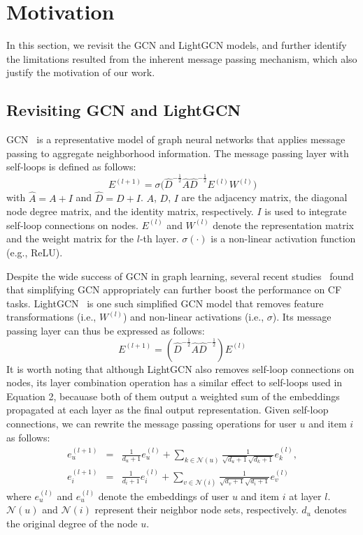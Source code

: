 \documentclass[sigconf,authorversion]{acmart}
\begin{document}
 \section{Motivation} \label{motivation}
In this section, we revisit the GCN and LightGCN models, and further identify the limitations resulted from the inherent message passing mechanism, which also justify the motivation of our work.

 


\subsection{Revisiting GCN and LightGCN}
GCN~\cite{GCN} is a representative model of graph neural networks that applies message passing to aggregate neighborhood information. The message passing layer with self-loops is defined as follows:
\begin{equation}
E^{(l+1)} = \sigma \Big(\hat{D}^{-\frac{1}{2}}\hat{A}\hat{D}^{-\frac{1}{2}}E^{(l)}W^{(l)} \Big)
\end{equation}
with $\hat{A} = A + I$ and $\hat{D} = D + I$. $A$, $D$, $I$ are the adjacency matrix, the diagonal node degree matrix, and the identity matrix, respectively. $I$ is used to integrate self-loop connections on nodes. $E^{(l)}$ and $W^{(l)}$ denote the representation matrix and the weight matrix for the $l$-th layer. $\sigma(\cdot)$ is a non-linear activation function (e.g., ReLU). 

Despite the wide success of GCN in graph learning, several recent studies~\cite{LightGCN,LR-GCCF,RGCF,SGCN} found that simplifying GCN appropriately can further boost the performance on CF tasks. LightGCN~\cite{LightGCN} is one such simplified GCN model that removes feature transformations (i.e., $W^{(l)}$) and non-linear activations (i.e., $\sigma$). Its message passing layer can thus be expressed as follows:
\begin{equation}
E^{(l+1)} = ({\hat{D}}^{-\frac{1}{2}}\hat{A}{\hat{D}}^{-\frac{1}{2}})E^{(l)}\label{LightGCN}
\end{equation}
It is worth noting that although LightGCN also removes self-loop connections on nodes, its layer combination operation has a similar effect to self-loops used in Equation 2, becauase both of them output a weighted sum of the embeddings propagated at each layer as the final output representation. Given self-loop connections, we can rewrite the message passing operations for user $u$ and item $i$ as follows:
\begin{eqnarray}
e_u^{(l+1)} &=& \frac{1}{{d}_u + 1} e_{u}^{(l)} + \sum_{k \in \mathcal{N}(u)} \frac{1}{\sqrt{{d}_u + 1}\sqrt{ {d}_k + 1}} e_k^{(l)}, \label{message_passing}\\
e_i^{(l+1)} &=& \frac{1}{{d}_i + 1} e_{i}^{(l)} + \sum_{v \in \mathcal{N}(i)} \frac{1}{\sqrt{{d}_v + 1}\sqrt{ {d}_i + 1}} e_v^{(l)} \label{message_passing2}
\end{eqnarray}
where $e_{u}^{(l)}$ and $e_{u}^{(l)}$ denote the embeddings of user $u$ and item $i$ at layer $l$. $\mathcal{N}(u)$ and $\mathcal{N}(i)$ represent their neighbor node sets, respectively. ${d}_u$ denotes the original degree of the node $u$. 
\end{document}
